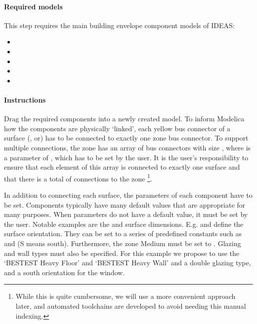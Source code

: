 \documentclass[10pt,a4paper]{article}
\begin{document}
\paragraph{Required models}
This step requires the main building envelope component models of IDEAS:
\begin{itemize}
\item {}
\item {}
\item {}
\item {}
\item {}
\end{itemize}

\paragraph{Instructions}
Drag the required components into a newly created model. To inform Modelica how the components are physically `linked', each yellow bus connector of a surface (,  or) has to be connected to exactly one zone bus connector.
To support multiple connections, the zone has an array of bus connectors with size , where  is a parameter of , which has to be set by the user. It is the user's responsibility to ensure that each element of this array is connected to exactly one surface and that there is a total of  connections to the zone \footnote{While this is quite cumbersome, we will use a more convenient approach later, and automated toolchains are developed to avoid needing this manual indexing.}.

In addition to connecting each surface, the parameters of each component have to be set. 
Components typically have many default values that are appropriate for many purposes.
When parameters do not have a default value, it must be set by the user. 
Notable examples are the  and surface dimensions. 
E.g.  and  define the surface orientation.
They can be set to a series of predefined constants such as 
and  (S means south).
Furthermore, the zone Medium must be set to .
Glazing and wall types must also be specified.
For this example we propose to use the `BESTEST Heavy Floor' and `BESTEST Heavy Wall'
and a double glazing type, and a south orientation for the window. 
\end{document}
